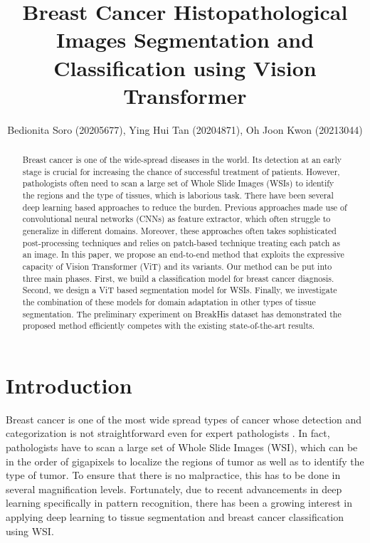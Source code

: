 \documentclass[review]{cvpr}
\begin{document}
\title{Breast Cancer Histopathological Images Segmentation and Classification using Vision Transformer}
\author{Bedionita Soro (20205677), Ying Hui Tan (20204871), Oh Joon Kwon (20213044)}

\maketitle

\begin{abstract}
Breast cancer is one of the wide-spread diseases in the world. Its detection at an early stage is crucial for increasing the chance of successful treatment of patients. However, pathologists often need to scan a large set of Whole Slide Images (WSIs) to identify the regions and the type of tissues, which is laborious task. There have been several deep learning based approaches to reduce the burden. Previous approaches made use of convolutional neural networks (CNNs) as feature extractor, which often struggle to generalize in different domains. Moreover, these approaches often takes sophisticated post-processing techniques and relies on patch-based technique treating each patch as an image. In this paper, we propose an end-to-end method that exploits the expressive capacity of Vision Transformer (ViT) and its variants. Our method can be put into three main phases. First, we build a classification model for breast cancer diagnosis. Second, we design a ViT based segmentation model for WSIs. Finally, we investigate the combination of these models for domain adaptation in other types of tissue segmentation. The preliminary experiment on BreakHis dataset has demonstrated the proposed method efficiently competes with the existing state-of-the-art results.
\end{abstract}

\section{Introduction}
Breast cancer \cite{7312934} is one of the most wide spread types of cancer whose detection and categorization is not straightforward even for expert pathologists \cite{Randell01}. In fact, pathologists have to scan a large set of Whole Slide Images (WSI), which can be in the order of gigapixels to localize the regions of tumor as well as to identify the type of tumor. To ensure that there is no malpractice, this has to be done in several magnification levels\cite{KRUPINSKI20061543}. Fortunately, due to recent advancements in deep learning specifically in pattern recognition\cite{russakovsky2015imagenet}, there has been a growing interest in applying deep learning to tissue segmentation and breast cancer classification using WSI\cite{lei2020medical,SRINIDHI2021101813}. 
\end{document}
